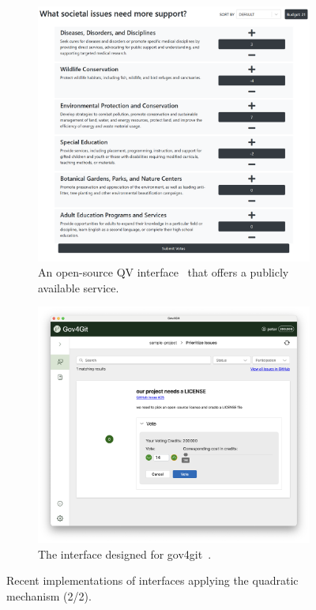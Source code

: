 \begin{figure}
    \ContinuedFloat
    \centering
    \begin{subfigure}[h]{0.6\textwidth}
        \centering
        \includegraphics[width=\textwidth]{content/image/curr_interface/geek.sg_interface.png}
        \caption{An open-source QV interface~\cite{yehjxraymondYehjxraymondQvapp2024} that offers a publicly available service.}
        \label{fig:fig2}
    \end{subfigure}
    \begin{subfigure}[h]{0.6\textwidth}
        \centering
        \includegraphics[width=\textwidth]{content/image/curr_interface/appvote.png}
        \caption{The interface designed for gov4git~\cite{Gov4gitDecentralizedPlatform2023}.}
        \label{fig:fig3}
    \end{subfigure}
    \caption{Recent implementations of interfaces applying the quadratic mechanism (2/2).}
    \label{fig:recentInterfaces2}
\end{figure}
